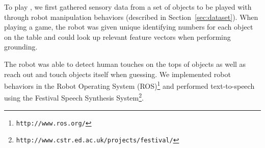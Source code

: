 To play \ispy, we first gathered sensory data from a set of objects to be played with through robot manipulation behaviors (described in Section~\ref{sec:dataset}).
When playing a game, the robot was given unique identifying numbers for each object on the table and could look up relevant feature vectors when performing grounding.

The robot was able to detect human touches on the tops of objects as well as reach out and touch objects itself when guessing.
We implemented robot behaviors in the Robot Operating System (ROS)\footnote{\texttt{http://www.ros.org/}} and performed text-to-speech using the Festival Speech Synthesis System\footnote{\texttt{http://www.cstr.ed.ac.uk/projects/festival/}}.